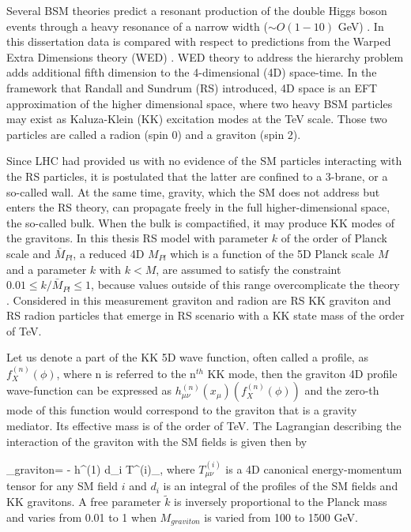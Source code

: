 Several BSM theories \cite{Huang:2017nnw, Dolan:2012ac, Kanemura:2016tan} predict a resonant production of the double Higgs boson events through a heavy resonance of a narrow width ($\sim O(1-10)$ GeV) \cite{Sirunyan:2018iwt}. In this dissertation data is compared with respect to predictions from the Warped Extra Dimensions theory (WED) \cite{Oliveira:2014kla}. WED theory to address the hierarchy problem adds additional fifth dimension to the 4-dimensional (4D) space-time. In the framework that Randall and Sundrum (RS) \cite{Randall:1999ee} introduced, 4D space is an EFT approximation of the higher dimensional space, where two heavy BSM particles may exist as Kaluza-Klein (KK) \cite{Uzawa:1999pg} excitation modes at the TeV scale. Those two particles are called a radion (spin 0) and a graviton (spin 2). 

Since LHC had provided us with no evidence of the SM particles interacting with the RS particles, it is postulated that the latter are confined to a 3-brane, or a so-called wall. At the same time, gravity, which the SM does not address but enters the RS theory, can propagate freely in the full higher-dimensional space, the so-called bulk. When the bulk is compactified, it may produce KK modes of the gravitons. In this thesis RS model with parameter $k$ of the order of Planck scale and $\bar{M}_{Pl}$, a reduced 4D $M_{Pl}$ which is a function of the 5D Planck scale $M$ and a parameter $k$ with $k<M$, are assumed to satisfy the constraint $0.01 \leq k / \bar{M}_{Pl} \leq 1$, because values outside of this range overcomplicate the theory \cite{Davoudiasl:1999jd}. Considered in this measurement graviton and radion are RS KK graviton and RS radion particles that emerge in RS scenario with a KK state mass of the order of TeV. 

Let us denote a part of the KK 5D wave function, often called a profile, as $f^{(n)}_X(\phi)$, where n is referred to the n$^{th}$ KK mode, then the graviton 4D profile wave-function can be expressed as $h^{(n)}_{\mu\nu}(x_\mu)(f^{(n)}_X(\phi))$ and the zero-th mode of this function would correspond to the graviton that is a gravity mediator. Its effective mass is of the order of TeV. The Lagrangian describing the interaction of the graviton with the SM fields is given then by 

\beqn\label{lagr_graviton}
\Lagr_{graviton}=  -  h^{\mu\nu(1)} \times d_i T^{(i)}_{\mu\nu},  
\eeqn
where $T^{(i)}_{\mu\nu}$ is a 4D canonical energy-momentum tensor \cite{Forger:2003ut} for any SM field $i$ and $d_i$ is an integral of the profiles of the SM fields and KK gravitons. A free parameter $\tilde{k}$ is inversely proportional to the Planck mass and varies from 0.01 to 1 when $M_{graviton}$ is varied from 100 to 1500 GeV. 

